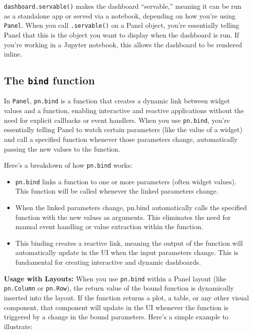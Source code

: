\documentclass[
  letterpaper,
  DIV=11,
  numbers=noendperiod]{scrreprt}
\providecommand{\tightlist}{%
  \setlength{\itemsep}{0pt}\setlength{\parskip}{0pt}}\usepackage{longtable,booktabs,array}
\begin{document}
\texttt{dashboard.servable()} makes the dashboard ``servable,'' meaning
it can be run as a standalone app or served via a notebook, depending on
how you're using \texttt{Panel}. When you call \texttt{.servable()} on a
Panel object, you're essentially telling Panel that this is the object
you want to display when the dashboard is run. If you're working in a
Jupyter notebook, this allows the dashboard to be rendered inline.

\hypertarget{the-bind-function}{%
\subsection{\texorpdfstring{The \texttt{bind}
function}{The bind function}}\label{the-bind-function}}

In \texttt{Panel}, \texttt{pn.bind} is a function that creates a dynamic
link between widget values and a function, enabling interactive and
reactive applications without the need for explicit callbacks or event
handlers. When you use \texttt{pn.bind}, you're essentially telling
Panel to watch certain parameters (like the value of a widget) and call
a specified function whenever those parameters change, automatically
passing the new values to the function.

Here's a breakdown of how \texttt{pn.bind} works:

\begin{itemize}
\tightlist
\item
  \texttt{pn.bind} links a function to one or more parameters (often
  widget values). This function will be called whenever the linked
  parameters change.
\item
  When the linked parameters change, pn.bind automatically calls the
  specified function with the new values as arguments. This eliminates
  the need for manual event handling or value extraction within the
  function.
\item
  This binding creates a reactive link, meaning the output of the
  function will automatically update in the UI when the input parameters
  change. This is fundamental for creating interactive and dynamic
  dashboards.
\end{itemize}

\textbf{Usage with Layouts:} When you use \texttt{pn.bind} within a
Panel layout (like \texttt{pn.Column} or \texttt{pn.Row}), the return
value of the bound function is dynamically inserted into the layout. If
the function returns a plot, a table, or any other visual component,
that component will update in the UI whenever the function is triggered
by a change in the bound parameters. Here's a simple example to
illustrate:
\end{document}

